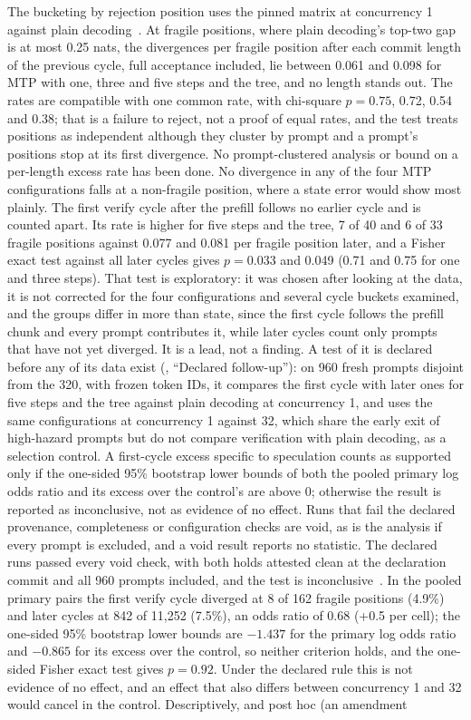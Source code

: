 The bucketing by rejection position uses the pinned matrix at concurrency 1 against plain decoding~. At fragile positions, where plain decoding's top-two gap is at most 0.25 nats, the divergences per fragile position after each commit length of the previous cycle, full acceptance included, lie between 0.061 and 0.098 for MTP with one, three and five steps and the tree, and no length stands out. The rates are compatible with one common rate, with chi-square $p=0.75$, 0.72, 0.54 and 0.38; that is a failure to reject, not a proof of equal rates, and the test treats positions as independent although they cluster by prompt and a prompt's positions stop at its first divergence. No prompt-clustered analysis or bound on a per-length excess rate has been done. No divergence in any of the four MTP configurations falls at a non-fragile position, where a state error would show most plainly. The first verify cycle after the prefill follows no earlier cycle and is counted apart. Its rate is higher for five steps and the tree, 7 of 40 and 6 of 33 fragile positions against 0.077 and 0.081 per fragile position later, and a Fisher exact test against all later cycles gives $p=0.033$ and 0.049 (0.71 and 0.75 for one and three steps). That test is exploratory: it was chosen after looking at the data, it is not corrected for the four configurations and several cycle buckets examined, and the groups differ in more than state, since the first cycle follows the prefill chunk and every prompt contributes it, while later cycles count only prompts that have not yet diverged. It is a lead, not a finding. A test of it is declared before any of its data exist (, ``Declared follow-up''): on 960 fresh prompts disjoint from the 320, with frozen token IDs, it compares the first cycle with later ones for five steps and the tree against plain decoding at concurrency 1, and uses the same configurations at concurrency 1 against 32, which share the early exit of high-hazard prompts but do not compare verification with plain decoding, as a selection control. A first-cycle excess specific to speculation counts as supported only if the one-sided 95\% bootstrap lower bounds of both the pooled primary log odds ratio and its excess over the control's are above 0; otherwise the result is reported as inconclusive, not as evidence of no effect. Runs that fail the declared provenance, completeness or configuration checks are void, as is the analysis if every prompt is excluded, and a void result reports no statistic. The declared runs passed every void check, with both holds attested clean at the declaration commit and all 960 prompts included, and the test is inconclusive~. In the pooled primary pairs the first verify cycle diverged at 8 of 162 fragile positions (4.9\%) and later cycles at 842 of 11,252 (7.5\%), an odds ratio of 0.68 (+0.5 per cell); the one-sided 95\% bootstrap lower bounds are $-1.437$ for the primary log odds ratio and $-0.865$ for its excess over the control, so neither criterion holds, and the one-sided Fisher exact test gives $p=0.92$. Under the declared rule this is not evidence of no effect, and an effect that also differs between concurrency 1 and 32 would cancel in the control. Descriptively, and post hoc (an amendment 
